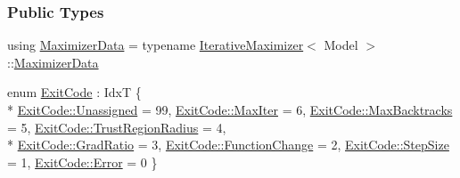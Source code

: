 \subsubsection*{Public Types}
\begin{DoxyCompactItemize}
\item 
using \hyperlink{classmappel_1_1TrustRegionMaximizer_a985b65b01842afcba340901554efa409}{Maximizer\+Data} = typename \hyperlink{classmappel_1_1IterativeMaximizer}{Iterative\+Maximizer}$<$ Model $>$\+::\hyperlink{classmappel_1_1TrustRegionMaximizer_a985b65b01842afcba340901554efa409}{Maximizer\+Data}
\item 
enum \hyperlink{classmappel_1_1IterativeMaximizer_a5dc8660cf33abf3f3a576f051466521c}{Exit\+Code} \+: IdxT \{ \\*
\hyperlink{classmappel_1_1IterativeMaximizer_a5dc8660cf33abf3f3a576f051466521ca3476bf9c3af766198bfbd4f065a51e69}{Exit\+Code\+::\+Unassigned} = 99, 
\hyperlink{classmappel_1_1IterativeMaximizer_a5dc8660cf33abf3f3a576f051466521cabbf52264f7a6e91c48a242f95aeed3db}{Exit\+Code\+::\+Max\+Iter} = 6, 
\hyperlink{classmappel_1_1IterativeMaximizer_a5dc8660cf33abf3f3a576f051466521ca9e5d3183756d69b44432394db6b6fd86}{Exit\+Code\+::\+Max\+Backtracks} = 5, 
\hyperlink{classmappel_1_1IterativeMaximizer_a5dc8660cf33abf3f3a576f051466521caadd208e6fbd6ef5ab84a287f259c3b81}{Exit\+Code\+::\+Trust\+Region\+Radius} = 4, 
\\*
\hyperlink{classmappel_1_1IterativeMaximizer_a5dc8660cf33abf3f3a576f051466521ca8d0cc41d71102a7952fefe3c63244fd4}{Exit\+Code\+::\+Grad\+Ratio} = 3, 
\hyperlink{classmappel_1_1IterativeMaximizer_a5dc8660cf33abf3f3a576f051466521ca8d75b053f108781c02ac7c22facc4338}{Exit\+Code\+::\+Function\+Change} = 2, 
\hyperlink{classmappel_1_1IterativeMaximizer_a5dc8660cf33abf3f3a576f051466521ca071449462d0c247e47313eb8c3129dd0}{Exit\+Code\+::\+Step\+Size} = 1, 
\hyperlink{classmappel_1_1IterativeMaximizer_a5dc8660cf33abf3f3a576f051466521ca902b0d55fddef6f8d651fe1035b7d4bd}{Exit\+Code\+::\+Error} = 0
 \}
\end{DoxyCompactItemize}
